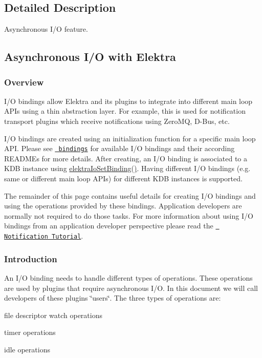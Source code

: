 \subsection{Detailed Description}
Asynchronous I/O feature. 

\hypertarget{group__kdbio_async}{}\subsection{Asynchronous I/\+O with Elektra}\label{group__kdbio_async}
\hypertarget{group__kdbio_Overview}{}\subsubsection{Overview}\label{group__kdbio_Overview}
I/O bindings allow Elektra and its plugins to integrate into different main loop A\+P\+Is using a thin abstraction layer. For example, this is used for notification transport plugins which receive notifications using Zero\+MQ, D-\/\+Bus, etc.

I/O bindings are created using an initialization function for a specific main loop A\+PI. Please see \href{https://www.libelektra.org/bindings/readme}{\texttt{ bindings}} for available I/O bindings and their according R\+E\+A\+D\+M\+Es for more details. After creating, an I/O binding is associated to a K\+DB instance using \mbox{\hyperlink{group__kdbio_ga187345483bdfbb404919c6797bc2db77}{elektra\+Io\+Set\+Binding()}}. Having different I/O bindings (e.\+g. same or different main loop A\+P\+Is) for different K\+DB instances is supported.

The remainder of this page contains useful details for creating I/O bindings and using the operations provided by these bindings. Application developers are normally not required to do those tasks. For more information about using I/O bindings from an application developer perspective please read the \href{doc_tutorials_notifications_md.html}{\texttt{ Notification Tutorial}}.\hypertarget{group__kdbio_Introduction}{}\subsubsection{Introduction}\label{group__kdbio_Introduction}
An I/O binding needs to handle different types of operations. These operations are used by plugins that require asynchronous I/O. In this document we will call developers of these plugins \char`\"{}users\char`\"{}. The three types of operations are\+:
\begin{DoxyItemize}
\item file descriptor watch operations
\item timer operations
\item idle operations
\end{DoxyItemize}

